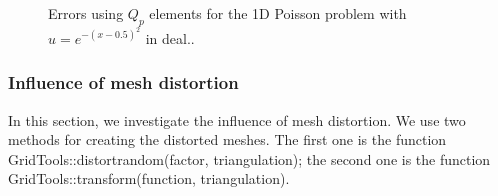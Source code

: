 \documentclass[review,3p]{elsarticle}
\begin{document}
\begin{figure}[!ht]
\caption{Errors using $Q_p$ elements for the 1D Poisson problem with $u=e^{-(x-0.5)^2}$ in deal..}
\label{py_1d_0_pois_1p0_u_exp_m_x_m_0p5_square_uniform_0_sm}
\end{figure}

\newpage
\subsubsection{Influence of mesh distortion}			\label{section_poisson_mesh_distortion}
In this section, we investigate the influence of mesh distortion.
We use two methods for creating the distorted meshes. 
The first one is the function 
GridTools::distort\textunderscore random(factor, triangulation); 
the second one is the function GridTools::transform(function, triangulation). 
\end{document}
